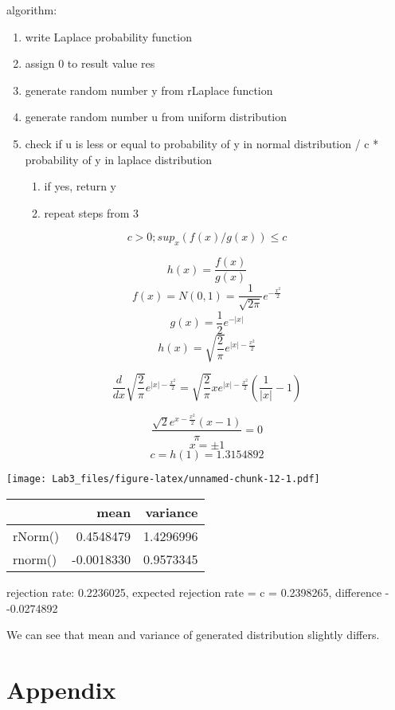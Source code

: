 \documentclass[
]{article}
\providecommand{\tightlist}{%
  \setlength{\itemsep}{0pt}\setlength{\parskip}{0pt}}
\begin{document}
algorithm:

\begin{enumerate}
\def\labelenumi{\arabic{enumi}.}
\tightlist
\item
  write Laplace probability function
\item
  assign 0 to result value res
\item
  generate random number y from rLaplace function
\item
  generate random number u from uniform distribution
\item
  check if u is less or equal to probability of y in normal distribution
  / c * probability of y in laplace distribution

  \begin{enumerate}
  \def\labelenumii{\alph{enumii})}
  \tightlist
  \item
    if yes, return y
  \item
    repeat steps from 3
  \end{enumerate}
\end{enumerate}

\[c>0;sup_x(f(x)/g(x)) \le c\]

\[h(x) = \frac {f(x)}  {g(x)}\]
\[f(x) = N(0,1) = \frac 1 {\sqrt{2 \pi}} e^{ - \frac {x^2} 2}\]
\[g(x) = \frac 1 2 e^{-|x|}\]
\[h(x) = \sqrt{\frac{2}{\pi }} e^{| x| -\frac{x^2}{2}}\]

\[\frac{d}{dx }\sqrt{\frac{2}{\pi }} e^{| x| -\frac{x^2}{2}}=\sqrt{\frac{2}{\pi }} x e^{| x| -\frac{x^2}{2}} \left(\frac{1}{| x| }-1\right)\]

\[\frac{\sqrt{2} e^{x-\frac{x^2}{2}} (x-1)}{\pi }=0\] \[x=\pm1\]
\[c = h(1) = 1.3154892\]

\texttt{[image: Lab3\_files/figure-latex/unnamed-chunk-12-1.pdf]}

\begin{longtable}[]{@{}lrr@{}}
\toprule
& mean & variance\tabularnewline
\midrule
\endhead
rNorm() & 0.4548479 & 1.4296996\tabularnewline
rnorm() & -0.0018330 & 0.9573345\tabularnewline
\bottomrule
\end{longtable}

rejection rate: 0.2236025, expected rejection rate = c = 0.2398265,
difference - -0.0274892

We can see that mean and variance of generated distribution slightly
differs.

\hypertarget{appendix}{%
\section{Appendix}\label{appendix}}
\end{document}

